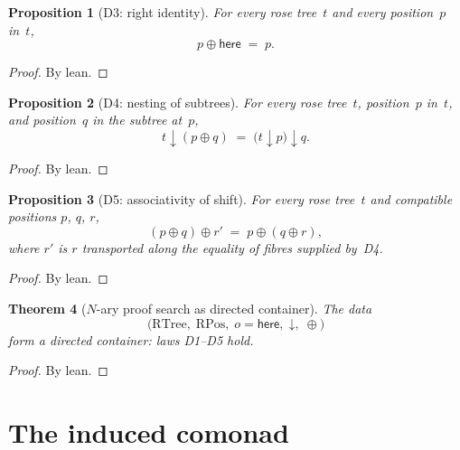 \documentclass[11pt,a4paper]{article}
\theoremstyle{plain}
\newtheorem{theorem}{Theorem}[section]
\newtheorem{proposition}[theorem]{Proposition}
\theoremstyle{definition}
\newcommand{\RTree}{\mathrm{RTree}}
\newcommand{\RPos}{\mathrm{RPos}}
\begin{document}
\begin{proposition}[D3: right identity]\label{prop:d3}
For every rose tree~$t$ and every position~$p$ in~$t$,
\begin{equation}
  p \oplus \mathsf{here} \;=\; p.
\end{equation}
\end{proposition}

\begin{proof}
By lean.
\end{proof}

\begin{proposition}[D4: nesting of subtrees]\label{prop:d4}
For every rose tree~$t$, position~$p$ in~$t$, and position~$q$ in the
subtree at~$p$,
\begin{equation}
  t \mathbin{\downarrow} (p \oplus q)
  \;=\;
  \bigl(t \mathbin{\downarrow} p\bigr) \mathbin{\downarrow} q.
\end{equation}
\end{proposition}

\begin{proof}
By lean.
\end{proof}

\begin{proposition}[D5: associativity of shift]\label{prop:d5}
For every rose tree~$t$ and compatible positions $p$, $q$, $r$,
\begin{equation}
  (p \oplus q) \oplus r' \;=\; p \oplus (q \oplus r),
\end{equation}
where $r'$ is $r$ transported along the equality of fibres supplied
by~D4.
\end{proposition}

\begin{proof}
By lean.
\end{proof}

\begin{theorem}[$N$-ary proof search as directed container]
\label{thm:proofsearchn}
The data
\[
  \bigl(
    \RTree,\;
    \RPos,\;
    o = \mathsf{here},\;
    {\mathord{\downarrow}},\;
    {\oplus}
  \bigr)
\]
form a directed container: laws D1--D5 hold.
\end{theorem}

\begin{proof}
By lean.
\end{proof}

\section{The induced comonad}
\end{document}
